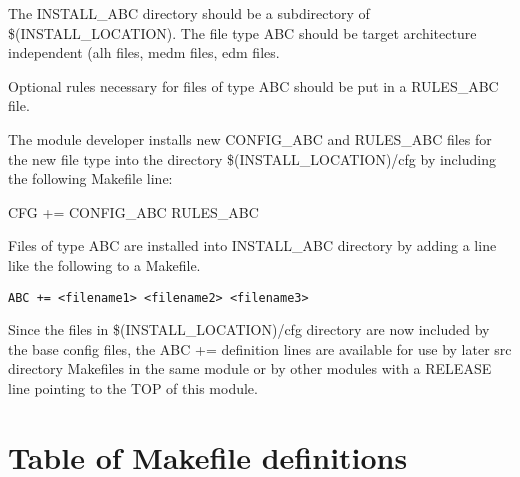 The INSTALL\_ABC directory should be a subdirectory of \$(INSTALL\_LOCATION). The file type ABC should be 
target architecture independent (alh files, medm files, edm files.

Optional rules necessary for files of type ABC should be put in a RULES\_ABC file.

The module developer installs new CONFIG\_ABC and RULES\_ABC files for the new file type into the directory 
\$(INSTALL\_LOCATION)/cfg by including the following Makefile line:

\begin{description}
\item {}CFG += CONFIG\_ABC RULES\_ABC

\end{description}

Files of type ABC are installed into INSTALL\_ABC directory by adding a line like the following to a Makefile.

\begin{description}
\item \verb|ABC += <filename1> <filename2> <filename3>|

\end{description}

Since the files in \$(INSTALL\_LOCATION)/cfg directory are now included by the base config files, the ABC += 
definition lines are available for use by later src directory Makefiles in the same module or by other modules with a 
RELEASE line pointing to the TOP of this module.

\section{Table of Makefile definitions}

